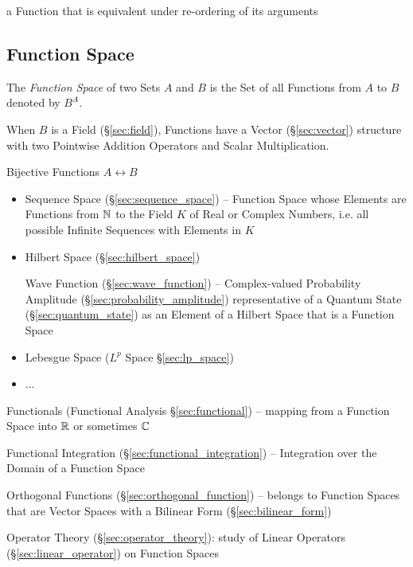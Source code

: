 a Function that is equivalent under re-ordering of its arguments



\subsection{Function Space}\label{sec:function_space}

The \emph{Function Space} of two Sets $A$ and $B$ is the Set of all Functions
from $A$ to $B$ denoted by $B^A$.

When $B$ is a Field (\S\ref{sec:field}), Functions have a Vector
(\S\ref{sec:vector}) structure with two Pointwise Addition Operators and Scalar
Multiplication. %

Bijective Functions $A \leftrightarrow B$

\begin{itemize}
  \item Sequence Space (\S\ref{sec:sequence_space}) -- Function Space whose
    Elements are Functions from $\mathbb{N}$ to the Field $K$ of Real or Complex
    Numbers, i.e. all possible Infinite Sequences with Elements in $K$
  \item Hilbert Space (\S\ref{sec:hilbert_space})

    \fist Wave Function (\S\ref{sec:wave_function}) -- Complex-valued
    Probability Amplitude (\S\ref{sec:probability_amplitude}) representative of
    a Quantum State (\S\ref{sec:quantum_state}) as an Element of a Hilbert Space
    that is a Function Space
  \item Lebesgue Space ($L^p$ Space \S\ref{sec:lp_space})
  \item ...
\end{itemize}

\fist Functionals (Functional Analysis \S\ref{sec:functional}) -- mapping from a
Function Space into $\mathbb{R}$ or sometimes $\mathbb{C}$

\fist Functional Integration (\S\ref{sec:functional_integration}) -- Integration
over the Domain of a Function Space

\fist Orthogonal Functions (\S\ref{sec:orthogonal_function}) -- belongs to
Function Spaces that are Vector Spaces with a Bilinear Form
(\S\ref{sec:bilinear_form})

\fist Operator Theory (\S\ref{sec:operator_theory}): study of Linear Operators
(\S\ref{sec:linear_operator}) on Function Spaces



